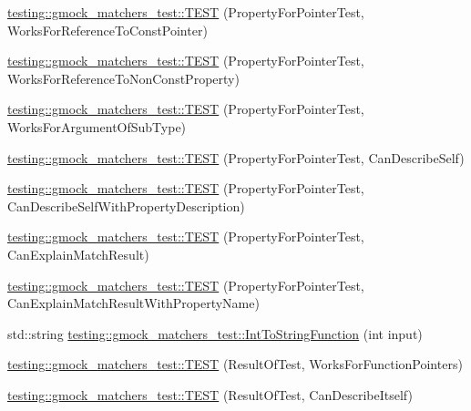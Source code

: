 \begin{DoxyCompactItemize}
\item 
\mbox{\hyperlink{namespacetesting_1_1gmock__matchers__test_a028687dfb04ec008ea129f9cc95aac62}{testing\+::gmock\+\_\+matchers\+\_\+test\+::\+T\+E\+ST}} (Property\+For\+Pointer\+Test, Works\+For\+Reference\+To\+Const\+Pointer)
\item 
\mbox{\hyperlink{namespacetesting_1_1gmock__matchers__test_a78762b60c9d0c985916b698e6d4c55e3}{testing\+::gmock\+\_\+matchers\+\_\+test\+::\+T\+E\+ST}} (Property\+For\+Pointer\+Test, Works\+For\+Reference\+To\+Non\+Const\+Property)
\item 
\mbox{\hyperlink{namespacetesting_1_1gmock__matchers__test_a4c2f4b483550e2e70b09eea3836b83e0}{testing\+::gmock\+\_\+matchers\+\_\+test\+::\+T\+E\+ST}} (Property\+For\+Pointer\+Test, Works\+For\+Argument\+Of\+Sub\+Type)
\item 
\mbox{\hyperlink{namespacetesting_1_1gmock__matchers__test_a064fc5dd5ca0106e8ed0fbc483472186}{testing\+::gmock\+\_\+matchers\+\_\+test\+::\+T\+E\+ST}} (Property\+For\+Pointer\+Test, Can\+Describe\+Self)
\item 
\mbox{\hyperlink{namespacetesting_1_1gmock__matchers__test_a8c0578e07cfe031fa9de3ed3e5bde34a}{testing\+::gmock\+\_\+matchers\+\_\+test\+::\+T\+E\+ST}} (Property\+For\+Pointer\+Test, Can\+Describe\+Self\+With\+Property\+Description)
\item 
\mbox{\hyperlink{namespacetesting_1_1gmock__matchers__test_a1a7e2a9641a06e492d58c75d900330d3}{testing\+::gmock\+\_\+matchers\+\_\+test\+::\+T\+E\+ST}} (Property\+For\+Pointer\+Test, Can\+Explain\+Match\+Result)
\item 
\mbox{\hyperlink{namespacetesting_1_1gmock__matchers__test_a09471d531d0bbeaca60cb850dfe6f33e}{testing\+::gmock\+\_\+matchers\+\_\+test\+::\+T\+E\+ST}} (Property\+For\+Pointer\+Test, Can\+Explain\+Match\+Result\+With\+Property\+Name)
\item 
std\+::string \mbox{\hyperlink{namespacetesting_1_1gmock__matchers__test_a94cad49187e6a3cc41d3ea59903214cf}{testing\+::gmock\+\_\+matchers\+\_\+test\+::\+Int\+To\+String\+Function}} (int input)
\item 
\mbox{\hyperlink{namespacetesting_1_1gmock__matchers__test_a5aea17c7d3dd74cbc0cbf181b3a9e5f8}{testing\+::gmock\+\_\+matchers\+\_\+test\+::\+T\+E\+ST}} (Result\+Of\+Test, Works\+For\+Function\+Pointers)
\item 
\mbox{\hyperlink{namespacetesting_1_1gmock__matchers__test_a1b5240d2272b679d7e3035554c2c5688}{testing\+::gmock\+\_\+matchers\+\_\+test\+::\+T\+E\+ST}} (Result\+Of\+Test, Can\+Describe\+Itself)

\end{DoxyCompactItemize}
